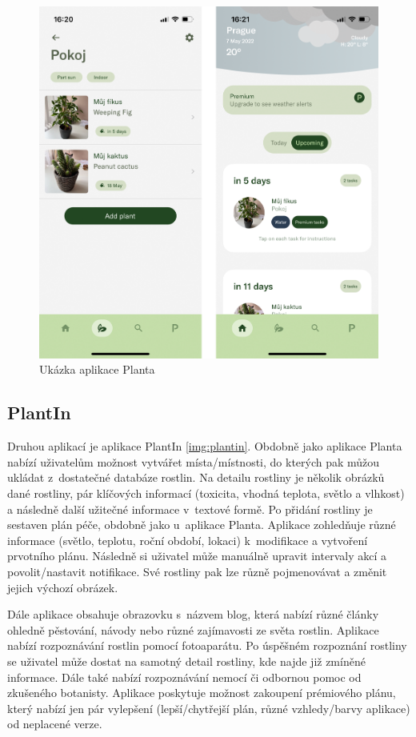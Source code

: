 \documentclass[thesis=M,czech]{FITthesis}[2019/12/23]
\begin{document}
    \begin{figure}
    	\centering
    	\includegraphics[width=0.75\linewidth]{images/planta.png}
      	\caption{Ukázka aplikace Planta}
      	\label{img:planta}
    \end{figure}

\subsection{PlantIn}
    
    Druhou aplikací je aplikace PlantIn \ref{img:plantin}. Obdobně jako aplikace Planta nabízí uživatelům možnost vytvářet místa/místnosti, do kterých pak můžou ukládat z~dostatečné databáze rostlin. Na detailu rostliny je několik obrázků dané rostliny, pár klíčových informací (toxicita, vhodná teplota, světlo a vlhkost) a následně další užitečné informace v~textové formě. Po přidání rostliny je sestaven plán péče, obdobně jako u~aplikace Planta. Aplikace zohledňuje různé informace (světlo, teplotu, roční období, lokaci) k~modifikace a vytvoření prvotního plánu. Následně si uživatel může manuálně upravit intervaly akcí a povolit/nastavit notifikace. Své rostliny pak lze různě pojmenovávat a změnit jejich výchozí obrázek.
    
    Dále aplikace obsahuje obrazovku s~názvem blog, která nabízí různé články ohledně pěstování, návody nebo různé zajímavosti ze světa rostlin. Aplikace nabízí rozpoznávání rostlin pomocí fotoaparátu. Po úspěšném rozpoznání rostliny se uživatel může dostat na samotný detail rostliny, kde najde již zmíněné informace. Dále také nabízí rozpoznávání nemocí či odbornou pomoc od zkušeného botanisty. Aplikace poskytuje možnost zakoupení prémiového plánu, který nabízí jen pár vylepšení (lepší/chytřejší plán, různé vzhledy/barvy aplikace) od neplacené verze.
    
\end{document}
